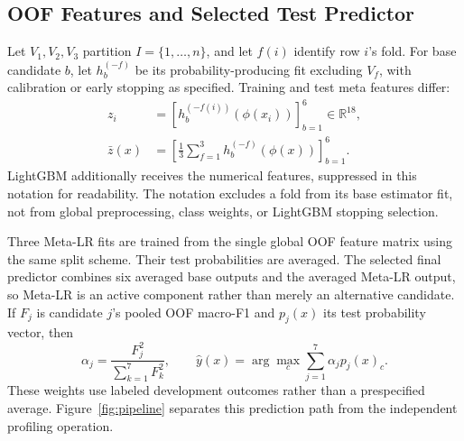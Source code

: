 \documentclass[doublecolumn]{ijcvsplatex}
\begin{document}
\subsection{OOF Features and Selected Test Predictor}
Let $V_1,V_2,V_3$ partition $I=\{1,\ldots,n\}$, and let $f(i)$ identify row $i$'s fold. For base candidate $b$, let $h_b^{(-f)}$ be its probability-producing fit excluding $V_f$, with calibration or early stopping as specified. Training and test meta features differ:
\begin{equation}
\begin{aligned}
z_i&=\left[h_b^{(-f(i))}(\phi(x_i))\right]_{b=1}^{6}\in\mathbb{R}^{18},\\
\bar z(x)&=\left[\frac{1}{3}\sum_{f=1}^{3}h_b^{(-f)}(\phi(x))\right]_{b=1}^{6}.
\end{aligned}
\end{equation}
LightGBM additionally receives the numerical features, suppressed in this notation for readability. The notation excludes a fold from its base estimator fit, not from global preprocessing, class weights, or LightGBM stopping selection.

Three Meta-LR fits are trained from the single global OOF feature matrix using the same split scheme. Their test probabilities are averaged. The selected final predictor combines six averaged base outputs and the averaged Meta-LR output, so Meta-LR is an active component rather than merely an alternative candidate. If $F_j$ is candidate $j$'s pooled OOF macro-F1 and $p_j(x)$ its test probability vector, then
\begin{equation}
\alpha_j=\frac{F_j^2}{\sum_{k=1}^{7}F_k^2},\qquad
\hat y(x)=\arg\max_c\sum_{j=1}^{7}\alpha_j p_j(x)_c.
\label{eq:ensemble}
\end{equation}
These weights use labeled development outcomes rather than a prespecified average. Figure~\ref{fig:pipeline} separates this prediction path from the independent profiling operation.
\end{document}

